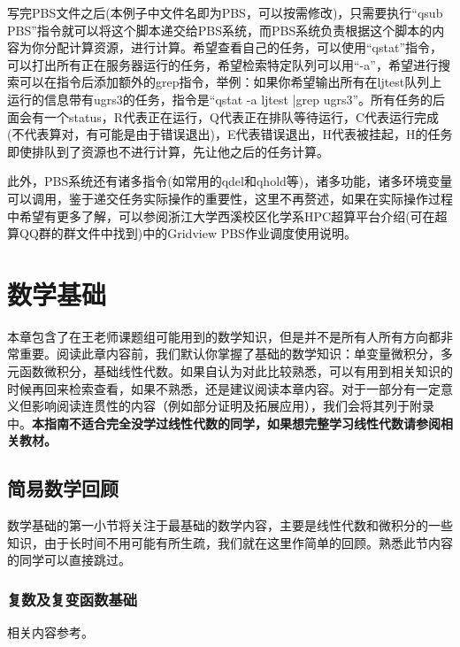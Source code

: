 \documentclass[12pt,a4paper,openany,twoside]{book}
\numberwithin{equation}{section}
\begin{document}
        写完PBS文件之后(本例子中文件名即为PBS，可以按需修改)，只需要执行“qsub PBS”指令就可以将这个脚本递交给PBS系统，而PBS系统负责根据这个脚本的内容为你分配计算资源，进行计算。希望查看自己的任务，可以使用“qstat”指令，可以打出所有正在服务器运行的任务，希望检索特定队列可以用“-a”，希望进行搜索可以在指令后添加额外的grep指令，举例：如果你希望输出所有在ljtest队列上运行的信息带有ugrs3的任务，指令是“qstat -a ljtest |grep ugrs3”。所有任务的后面会有一个status，R代表正在运行，Q代表正在排队等待运行，C代表运行完成(不代表算对，有可能是由于错误退出)，E代表错误退出，H代表被挂起，H的任务即使排队到了资源也不进行计算，先让他之后的任务计算。

        此外，PBS系统还有诸多指令(如常用的qdel和qhold等)，诸多功能，诸多环境变量可以调用，鉴于递交任务实际操作的重要性，这里不再赘述，如果在实际操作过程中希望有更多了解，可以参阅浙江大学西溪校区化学系HPC超算平台介绍(可在超算QQ群的群文件中找到)中的Gridview PBS作业调度使用说明。
      
    \chapter{数学基础}

      本章包含了在王老师课题组可能用到的数学知识，但是并不是所有人所有方向都非常重要。阅读此章内容前，我们默认你掌握了基础的数学知识：单变量微积分，多元函数微积分，基础线性代数。如果自认为对此比较熟悉，可以有用到相关知识的时候再回来检索查看，如果不熟悉，还是建议阅读本章内容。对于一部分有一定意义但影响阅读连贯性的内容（例如部分证明及拓展应用），我们会将其列于附录中。\textbf{本指南不适合完全没学过线性代数的同学，如果想完整学习线性代数请参阅相关教材。}

      \section{简易数学回顾}
      
        数学基础的第一小节将关注于最基础的数学内容，主要是线性代数和微积分的一些知识，由于长时间不用可能有所生疏，我们就在这里作简单的回顾。熟悉此节内容的同学可以直接跳过。

        \subsection{复数及复变函数基础}

          相关内容参考\cite{methods_in_math_phys_liang}。

          {}
          
\end{document}
